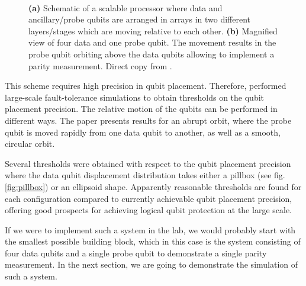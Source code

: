 \begin{figure}[H]
	\centering
	\\
	\caption[paper]{\textbf{(a)} Schematic of a scalable processor where data and ancillary/probe qubits are arranged in arrays in two different layers/stages which are moving relative to each other. \textbf{(b)} Magnified view of four data and one probe qubit. The movement results in the probe qubit orbiting above the data qubits allowing to implement a parity measurement. Direct copy from \cite{OGorman2016}.}
	\label{FIG:paper}
\end{figure}

This scheme requires high precision in qubit placement. Therefore, \citet{OGorman2016} performed large-scale fault-tolerance simulations to obtain thresholds on the qubit placement precision. The relative motion of the qubits can be performed in different ways. The paper presents results for an abrupt orbit, where the probe qubit is moved rapidly from one data qubit to another, as well as a smooth, circular orbit.

Several thresholds were obtained with respect to the qubit placement precision where the data qubit displacement distribution takes either a pillbox (see fig.\@ \ref{fig:pillbox}) or an ellipsoid shape. 
Apparently reasonable thresholds are found for each configuration compared to currently achievable qubit placement precision, offering good prospects for achieving logical qubit protection at the large scale. 

If we were to implement such a system in the lab, we would probably start with the smallest possible building block, which in this case is the system consisting of four data qubits and a single probe qubit to demonstrate a single parity measurement. In the next section, we are going to demonstrate the simulation of such a system. 
